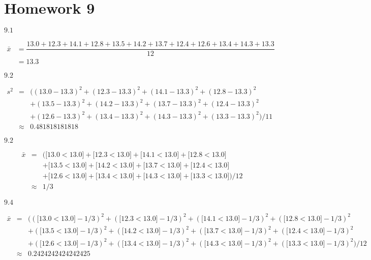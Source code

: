 \documentclass{article}
\newcommand{\problem}[2]{$\boxed{\text{#1.#2}}$}
\newcommand{\multistep}[1]{\begin{array}{rl} #1 \end{array}}
\begin{document}
\section*{Homework 9}

\problem{9}{1}

\[\multistep{\bar{x}&=\dfrac{13.0+12.3+14.1+12.8+13.5+14.2+13.7+12.4+12.6+13.4+14.3+13.3}{12} \\ &=13.3}\]

\problem{9}{2}

\[\begin{array}{lll}s^2&= & (
(13.0 - 13.3)^2
+(12.3 - 13.3)^2
+(14.1 - 13.3)^2
+(12.8 - 13.3)^2 \\
& & +(13.5 - 13.3)^2
+(14.2 - 13.3)^2
+(13.7 - 13.3)^2
+(12.4 - 13.3)^2 \\
& & +(12.6 - 13.3)^2
+(13.4 - 13.3)^2
+(14.3 - 13.3)^2
+(13.3 - 13.3)^2) / 11 \\
&\approx&0.481818181818\end{array}\]

\problem{9}{2}

\[\begin{array}{lll}\bar{x}&= & (
\lbrack13.0 < 13.0\rbrack
+\lbrack12.3 < 13.0\rbrack
+\lbrack14.1 < 13.0\rbrack
+\lbrack12.8 < 13.0\rbrack \\
& & + \lbrack13.5 < 13.0\rbrack
+\lbrack14.2 < 13.0\rbrack
+\lbrack13.7 < 13.0\rbrack
+\lbrack12.4 < 13.0\rbrack \\
& & + \lbrack12.6 < 13.0\rbrack
+\lbrack13.4 < 13.0\rbrack
+\lbrack14.3 < 13.0\rbrack
+\lbrack13.3 < 13.0\rbrack) / 12 \\
&\approx&1/3\end{array}\]

\problem{9}{4}

\[\begin{array}{lll}\bar{x}&= & (
(\lbrack13.0 < 13.0\rbrack - 1/3)^2
+(\lbrack12.3 < 13.0\rbrack - 1/3)^2
+(\lbrack14.1 < 13.0\rbrack - 1/3)^2
+(\lbrack12.8 < 13.0\rbrack - 1/3)^2 \\
& & + (\lbrack13.5 < 13.0\rbrack - 1/3)^2
+(\lbrack14.2 < 13.0\rbrack - 1/3)^2
+(\lbrack13.7 < 13.0\rbrack - 1/3)^2
+(\lbrack12.4 < 13.0\rbrack - 1/3)^2 \\
& & + (\lbrack12.6 < 13.0\rbrack - 1/3)^2
+(\lbrack13.4 < 13.0\rbrack - 1/3)^2
+(\lbrack14.3 < 13.0\rbrack - 1/3)^2
+(\lbrack13.3 < 13.0\rbrack - 1/3)^2) / 12 \\
&\approx&0.2424242424242425\end{array}\]
\end{document}
